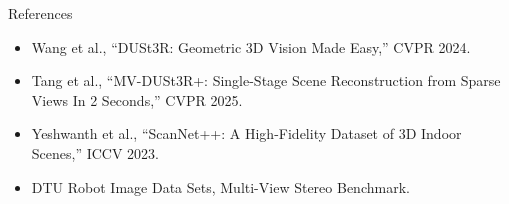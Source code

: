 \begin{frame}{References}
  \footnotesize
  \begin{itemize}
    \item Wang et al., ``DUSt3R: Geometric 3D Vision Made Easy,'' CVPR 2024.
    \item Tang et al., ``MV-DUSt3R+: Single-Stage Scene Reconstruction from
    Sparse Views In 2 Seconds,'' CVPR 2025.
    \item Yeshwanth et al., ``ScanNet++: A High-Fidelity Dataset of 3D Indoor
    Scenes,'' ICCV 2023.
    \item DTU Robot Image Data Sets, Multi-View Stereo Benchmark.
  \end{itemize}
\end{frame}
